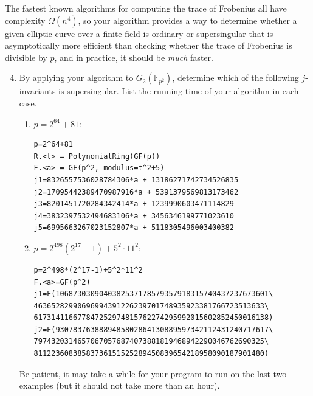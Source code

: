 \documentclass[11pt]{article}
\newcommand{\Fptwo}{\mathbb{F}_{p^2}}
\theoremstyle{definition}
\begin{document}
The fastest known algorithms for computing the trace of Frobenius all have complexity $\Omega(n^4)$, so your algorithm provides a way to determine whether a given elliptic curve over a finite field is ordinary or supersingular that is asymptotically more efficient than checking whether the trace of Frobenius is divisible by $p$, and in practice, it should be \emph{much} faster.

\begin{enumerate}[{\bf (a)}]
\setcounter{enumi}{3}
\item By applying your algorithm to $G_2(\Fptwo)$, determine which of the following $j$-invariants is supersingular.
List the running time of your algorithm in each case.
\begin{enumerate}[{\bf (i)}]
\item $p=2^{64}+81$:
\begin{lstlisting}
p=2^64+81
R.<t> = PolynomialRing(GF(p))
F.<a> = GF(p^2, modulus=t^2+5)
j1=8326557536028784306*a + 13186271742734526835
j2=17095442389470987916*a + 5391379569813173462
j3=8201451720284342414*a + 1239990603471114829
j4=3832397532494683106*a + 3456346199771023610
j5=6995663267023152807*a + 5118305496003400382
\end{lstlisting}
\item $p=2^{498}(2^{17}-1)+5^2\cdot11^2$:
\begin{lstlisting}
p=2^498*(2^17-1)+5^2*11^2
F.<a>=GF(p^2)
j1=F(1068730309040382537178579357918315740437237673601\
46365282990696994391226239701748935923381766723513633\
617314116677847252974815762274295992015602852450016138)
j2=F(9307837638889485802864130889597342112431240717617\
79743203146570670576874073881819468942290046762690325\
81122360838583736151525289450839654218958090187901480)
\end{lstlisting}
\end{enumerate}
Be patient, it may take a while for your program to run on the last two examples (but it should not take more than an hour).
\end{enumerate}
\end{document}
